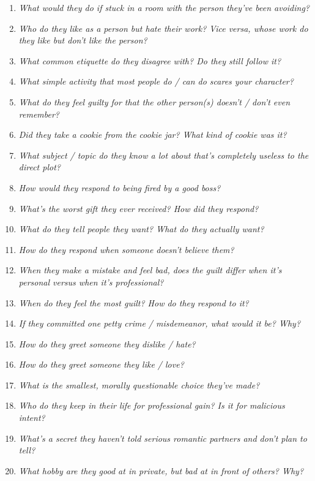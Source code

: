 \begin{enumerate}
    \item\textit{What would they do if stuck in a room with the person they’ve been avoiding?}
    \item\textit{Who do they like as a person but hate their work? Vice versa, whose work do they like but don’t like the person?}
    \item\textit{What common etiquette do they disagree with? Do they still follow it?}
    \item\textit{What simple activity that most people do / can do scares your character?}
    \item\textit{What do they feel guilty for that the other person(s) doesn’t / don’t even remember?}
    \item\textit{Did they take a cookie from the cookie jar? What kind of cookie was it?}
    \item\textit{What subject / topic do they know a lot about that’s completely useless to the direct plot?}
    \item\textit{How would they respond to being fired by a good boss?}
    \item\textit{What’s the worst gift they ever received? How did they respond?}
    \item\textit{What do they tell people they want? What do they actually want?}
    \item\textit{How do they respond when someone doesn’t believe them?}
    \item\textit{When they make a mistake and feel bad, does the guilt differ when it’s personal versus when it’s professional?}
    \item\textit{When do they feel the most guilt? How do they respond to it?}
    \item\textit{If they committed one petty crime / misdemeanor, what would it be? Why?}
    \item\textit{How do they greet someone they dislike / hate?}
    \item\textit{How do they greet someone they like / love?}
    \item\textit{What is the smallest, morally questionable choice they’ve made?}
    \item\textit{Who do they keep in their life for professional gain? Is it for malicious intent?}
    \item\textit{What’s a secret they haven’t told serious romantic partners and don’t plan to tell?}
    \item\textit{What hobby are they good at in private, but bad at in front of others? Why?}

\end{enumerate}
